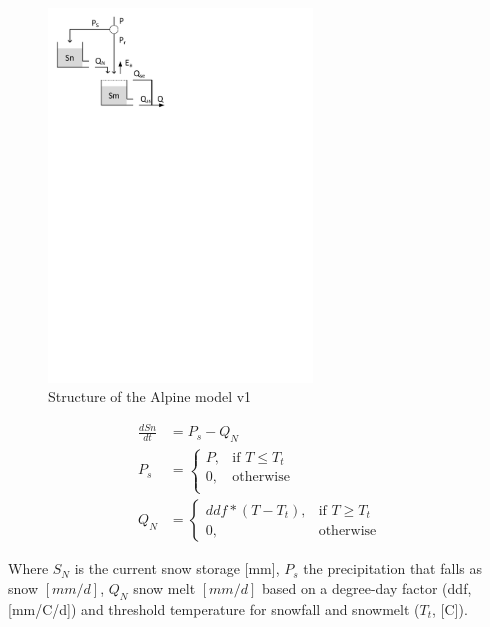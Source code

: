 { 																	%
\begin{figure}
\includegraphics[trim=1cm 22cm 9cm 1cm,width=7cm,keepaspectratio]{./files/06_schematic.pdf}
\caption{Structure of the Alpine model v1} \label{fig:06_schematic}
\end{figure}

\begin{align}
	\frac{dSn}{dt} &= P_s-Q_N \\
	P_s &= \begin{cases}
		P, &\text{if } T \leq T_t \\
		0, & \text{otherwise} \\
	\end{cases} \\
	Q_N &= 
	\begin{cases}
		ddf*(T - T_t), & \text{if } T \geq T_t \\
		0, & \text{otherwise}
	\end{cases}
\end{align}

Where $S_N$ is the current snow storage [mm], $P_s$ the precipitation that falls as snow $[mm/d]$, $Q_N$ snow melt $[mm/d]$ based on a degree-day factor (ddf, [mm/\degree C/d]) and threshold temperature for snowfall and snowmelt ($T_t$, [\degree C]).

}

